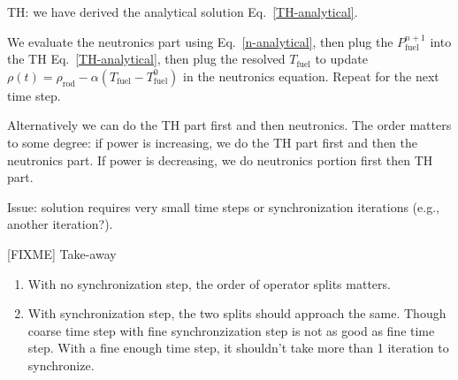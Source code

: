 \documentclass{school-22.211-notes}
\begin{document}
TH: we have derived the analytical solution Eq.~\ref{TH-analytical}.


We evaluate the neutronics part using Eq.~\ref{n-analytical}, then plug the $P_{\mathrm{fuel}}^{n+1}$ into the TH Eq.~\ref{TH-analytical}, then plug the resolved $T_{\mathrm{fuel}}$ to update $\rho(t) = \rho_{\mathrm{rod}} - \alpha (T_{\mathrm{fuel}} - T_{\mathrm{fuel}}^0)$ in the neutronics equation. Repeat for the next time step. 

Alternatively we can do the TH part first and then neutronics. The order matters to some degree: if power is increasing, we do the TH part first and then the neutronics part. If power is decreasing, we do neutronics portion first then TH part. 

Issue: solution requires very small time steps or synchronization iterations (e.g., another iteration?). 



[FIXME]
Take-away
\begin{enumerate}
\item With no synchronization step, the order of operator splits matters. 
\item With synchronization step, the two splits should approach the same. Though coarse time step with fine synchronzization step is not as good as fine time step. With a fine enough time step, it shouldn't take more than 1 iteration to synchronize. 
\end{enumerate}
\end{document}
